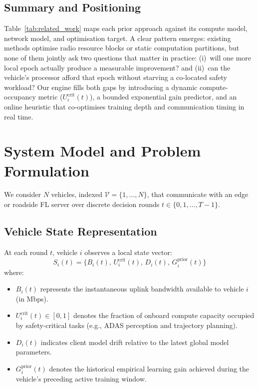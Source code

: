 \documentclass[conference]{IEEEtran}
\begin{document}
\subsection{Summary and Positioning}
Table~\ref{tab:related_work} maps each prior approach against its compute model, network model, and optimisation target. A clear pattern emerges: existing methods optimise radio resource blocks or static computation partitions, but none of them jointly ask two questions that matter in practice: (i)~will one more local epoch actually produce a measurable improvement? and (ii)~can the vehicle's processor afford that epoch without starving a co-located safety workload? Our engine fills both gaps by introducing a dynamic compute-occupancy metric ($U_i^{\text{crit}}(t)$), a bounded exponential gain predictor, and an online heuristic that co-optimises training depth and communication timing in real time.

\section{System Model and Problem Formulation}
We consider $N$ vehicles, indexed $\mathcal{V} = \{1, \dots, N\}$, that communicate with an edge or roadside FL server over discrete decision rounds $t \in \{0, 1, \dots, T{-}1\}$.

\subsection{Vehicle State Representation}
At each round $t$, vehicle $i$ observes a local state vector:
\begin{equation}
S_i(t) = \{B_i(t),\, U_i^{\text{crit}}(t),\, D_i(t),\, G_i^{\text{prior}}(t)\}
\end{equation}
where:
\begin{itemize}
    \item $B_i(t)$ represents the instantaneous uplink bandwidth available to vehicle $i$ (in Mbps).
    \item $U_i^{\text{crit}}(t) \in [0, 1]$ denotes the fraction of onboard compute capacity occupied by safety-critical tasks (e.g., ADAS perception and trajectory planning).
    \item $D_i(t)$ indicates client model drift relative to the latest global model parameters.
    \item $G_i^{\text{prior}}(t)$ denotes the historical empirical learning gain achieved during the vehicle's preceding active training window.
\end{itemize}
\end{document}
